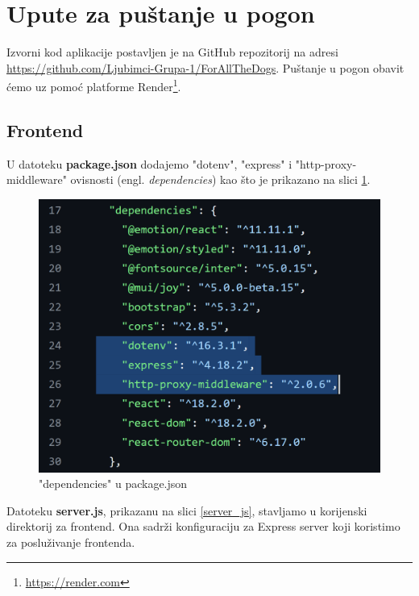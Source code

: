 			\eject 
		
		\section{Upute za puštanje u pogon}
		
			Izvorni kod aplikacije postavljen je na GitHub repozitorij na adresi \url{https://github.com/Ljubimci-Grupa-1/ForAllTheDogs}. Puštanje u pogon obavit ćemo uz pomoć platforme Render\footnote{\url{https://render.com}}.
			
			\subsection{Frontend}
			
			U datoteku \textbf{package.json} dodajemo "dotenv", "express" i "http-proxy-middleware" ovisnosti (engl. \textit{dependencies}) kao što je prikazano na slici \ref{dependencies}.
			
			\begin{figure}[H]
				\includegraphics[scale=0.6]{slike/dependencies.PNG} 
				\centering
				\caption{"dependencies" u package.json}
				\label{dependencies}
			\end{figure}
			
			Datoteku \textbf{server.js}, prikazanu na slici \ref{server_js}, stavljamo u korijenski direktorij za frontend. Ona sadrži konfiguraciju za Express server koji koristimo za posluživanje frontenda.
			
